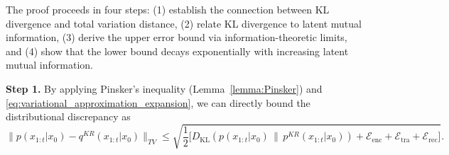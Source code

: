 \documentclass{article} %
\begin{document}
\begin{proofwithframe}
The proof proceeds in four steps: (1) establish the connection between KL divergence and total variation distance, (2) relate KL divergence to latent mutual information, (3) derive the upper error bound via information-theoretic limits, and (4) show that the lower bound decays exponentially with increasing latent mutual information.

\textbf{Step 1.} By applying Pinsker's inequality (Lemma~\ref{lemma:Pinsker}) and \eqref{eq:variational_approximation_expansion}, we can directly bound the distributional discrepancy as
\begin{equation} \label{eq:pinsker_distribution_kl}
    \| p(x_{1:t} | x_0) - q^{KR}(x_{1:t} | x_0) \|_{TV} \leq  \sqrt{\frac{1}{2}\big[D_{\mathrm{KL}}\left( p(x_{1:t} | x_0) \,\|\, p^{KR}(x_{1:t} | x_0)\right) + \mathcal{E}_{\text{enc}} + \mathcal{E}_{\text{tra}} + \mathcal{E}_{\text{rec}}\big]} .
\end{equation}


\end{proofwithframe}
\end{document}
